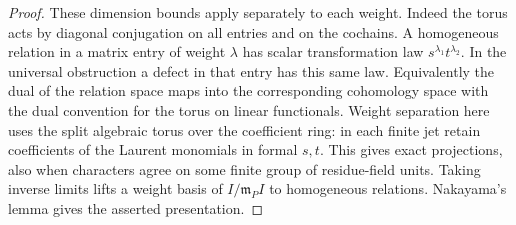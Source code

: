 \documentclass[a4paper,11pt]{article}
\theoremstyle{definition}
\theoremstyle{remark}
\numberwithin{equation}{section}
\begin{document}
\begin{proof}
These dimension bounds apply separately to each weight. Indeed
the torus acts by diagonal conjugation on all entries and on the
cochains. A homogeneous relation in a matrix entry of weight
\(\lambda\) has scalar transformation law \(s^{\lambda_1}t^{\lambda_2}\).
In the universal obstruction a defect in that entry has this same
law. Equivalently the dual of the relation space maps into the
corresponding cohomology space with the dual convention for the
torus on linear functionals. Weight separation here uses the
split algebraic torus over the coefficient ring: in each finite
jet retain coefficients of the Laurent monomials in formal \(s,t\).
This gives exact projections, also when characters agree on some
finite group of residue-field units. Taking inverse limits lifts
a weight basis of \(I/\mathfrak m_P I\) to homogeneous relations.
Nakayama's lemma gives the asserted presentation.
\end{proof}
\end{document}
